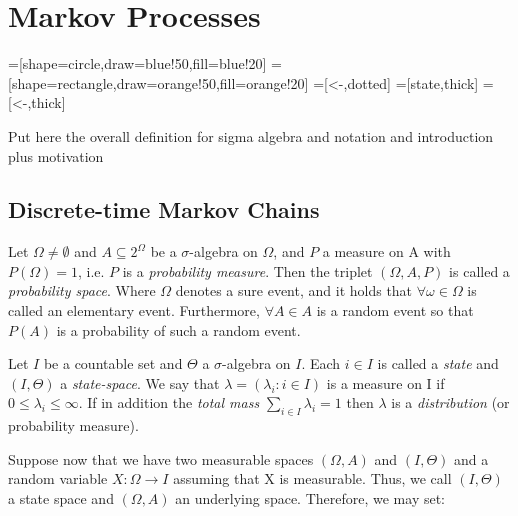 \chapter{Markov Processes}  %

\ifpdf%
    \graphicspath{{Chapter1/Figs/Raster/}{Chapter1/Figs/PDF/}{Chapter1/Figs/}}
\else
    \graphicspath{{Chapter1/Figs/Vector/}{Chapter1/Figs/}}
\fi

=[shape=circle,draw=blue!50,fill=blue!20]
=[shape=rectangle,draw=orange!50,fill=orange!20]
=[<-,dotted]
=[state,thick]
=[<-,thick]

Put here the overall definition for sigma algebra and notation and introduction plus motivation

\section{Discrete-time Markov Chains} %

Let $\Omega \neq \emptyset$ and $A \subseteq 2^{\Omega}$ be a $\sigma$-algebra on $\Omega$, and $P$ a measure on A with $P(\Omega) = 1$, i.e. $P$ is a {\it probability measure}. Then the triplet $(\Omega, A, P)$ is called a {\it probability space}. Where $\Omega$ denotes a sure event, and it holds that $\forall \omega \in \Omega$ is called an elementary event. Furthermore, $\forall A \in A$ is a random event  so that $P(A)$ is a probability of such a random event. 

Let $I$ be a countable set and $\Theta$ a $\sigma$-algebra on $I$. Each $i \in I$ is called a \textit{state} and $(I,\Theta)$ a \textit{state-space}. We say that $\lambda = (\lambda_i : i \in I) $ is a measure on I if $0 \leq \lambda_i \leq \infty$. If in addition the {\it total mass} $\sum_{i \in I} \lambda_i = 1$ then $\lambda$ is a {\it distribution} (or probability measure). 

Suppose now that we have two measurable spaces $(\Omega,A)$ and $(I,\Theta)$ and a random variable $X: \Omega \rightarrow I$ assuming that X is measurable. Thus, we call $(I,\Theta)$ a state space and $(\Omega, A)$ an underlying space. Therefore, we may set:

